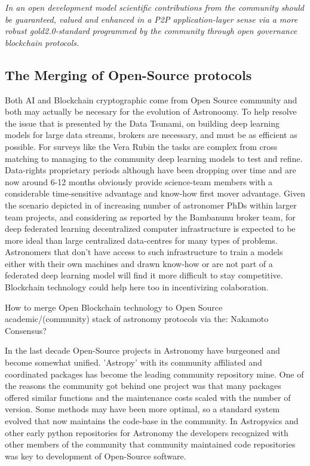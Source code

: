 \documentclass[final,5p,times,twocolumn,authoryear]{elsarticle}
\begin{document}
\emph{In an open development model scientific contributions from the community should be guaranteed, valued and enhanced in a P2P application-layer sense via a more robust gold2.0-standard programmed by the community through open governance blockchain protocols.}


\subsection{The Merging of Open-Source protocols}

Both AI and Blockchain cryptographic come from Open Source community and both may actually be necesary for the evolution of Astronoomy. To help resolve the issue that is presented by the Data Tsunami, on building deep learning models for large data streams, brokers are necessary, and must be as efficient as possible. For surveys like the Vera Rubin the tasks are complex from cross matching to managing to the community deep learning models to test and refine. Data-rights proprietary periods although have been dropping over time and are now around 6-12 months obviously provide science-team members with a considerable time-sensitive advantage and know-how first mover advantage.  Given the scenario depicted in \label{btc2:sec:sub:half} of increasing number of astronomer PhDs within larger team projects, and considering as reported by the Bambanunu broker team, for deep federated learning decentralized computer infrastructure is expected to be more ideal than large centralized data-centres for many types of problems.  Astronomers that don't have access to such infrastructure to train a models either with their own machines and drawn know-how or are not part of a federated deep learning model will find it more difficult to stay competitive. Blockchain technology could help here too in incentivizing colaboration.   

How to merge Open Blockchain technology to Open Source academic/(community) stack of astronomy protocols via the: Nakamoto Consensus?

In the last decade Open-Source projects in Astronomy have burgeoned and become somewhat unified. 'Astropy' with its community affiliated and coordinated packages has become the leading community repository mine.  One of the reasons the community got behind one project was that many packages offered similar functions and the maintenance costs scaled with the number of version. Some methods may have been more optimal, so a standard system evolved that now maintains the code-base in the community. In Astropysics and other early python repositories for Astronomy the developers recognized with other members of the community that community maintained code repositories was key to development of Open-Source software.
\end{document}
